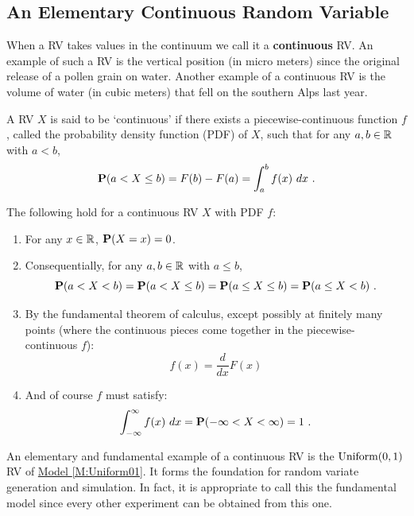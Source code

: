 \subsection{An Elementary Continuous Random Variable}\label{S:ElemContRV}

When a RV takes values in the continuum we call it a {\bf continuous} RV.  An example of such a RV is the vertical position (in micro meters) since the original release of a pollen grain on water.  Another example of a continuous RV is the volume of water (in cubic meters) that fell on the southern Alps last year.  
\begin{definition}
A RV $X$ is said to be `continuous' if there exists a piecewise-continuous function $f$, called the probability density function (PDF) of $X$, such that for any $a, b \in \mathbb{R}$ with $a < b$,
\[
\mathbf{P}(a < X \leq b) = F(b)-F(a) = \int_a^b f(x) \ dx \ .
\]
\end{definition}
The following hold for a continuous RV $X$ with PDF $f$:
\begin{enumerate}
\item For any $x \in \mathbb{R}$, $\mathbf{P}(X=x)=0$.
\item Consequentially, for any $a,b \in \mathbb{R}$ with $a \leq b$,
\[
\mathbf{P}(a < X < b ) = \mathbf{P}(a < X \leq b) = \mathbf{P}(a \leq X \leq b) = \mathbf{P}(a \leq X < b) \ .
\]
\item By the fundamental theorem of calculus, except possibly at finitely many points (where the continuous pieces come together in the piecewise-continuous $f$):
\[
f(x) = \frac{d}{dx} F(x)
\]
\item And of course $f$ must satisfy:
\[
\int_{-\infty}^{\infty} f(x) \ dx = \mathbf{P}(-\infty < X < \infty) = 1 \ .
\] 
\end{enumerate}

An elementary and fundamental example of a continuous RV is the $\mbox{{\rm Uniform}}(0,1)$ RV of \hyperref[M:Uniform01]{Model \ref*{M:Uniform01}}.  It forms the foundation for random variate generation and simulation.  In fact, it is appropriate to call this the fundamental model since every other experiment can be obtained from this one.

